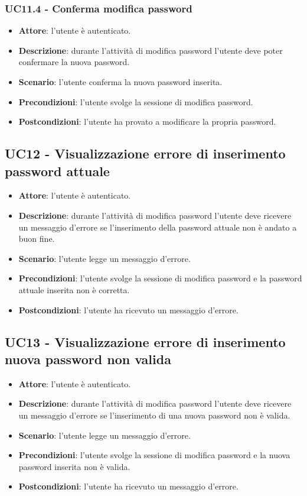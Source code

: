 \subsubsection{UC11.4 - Conferma modifica password}
\begin{itemize}
    \item \textbf{Attore}: l'utente è autenticato.
    \item \textbf{Descrizione}: durante l'attività di modifica password l'utente deve poter confermare la nuova password.
    \item \textbf{Scenario}: l'utente conferma la nuova password inserita. 
    \item \textbf{Precondizioni}: l'utente svolge la sessione di modifica password.
    \item \textbf{Postcondizioni}: l'utente ha provato a modificare la propria password.
\end{itemize}

\subsection{UC12 - Visualizzazione errore di inserimento password attuale}
\begin{itemize}
    \item \textbf{Attore}: l'utente è autenticato.
    \item \textbf{Descrizione}: durante l'attività di modifica password l'utente deve ricevere un messaggio d'errore se l'inserimento della password attuale non è andato a buon fine.
    \item \textbf{Scenario}: l'utente legge un messaggio d'errore. 
    \item \textbf{Precondizioni}: l'utente svolge la sessione di modifica password e la password attuale inserita non è corretta.
    \item \textbf{Postcondizioni}: l'utente ha ricevuto un messaggio d'errore.
\end{itemize}

\subsection{UC13 - Visualizzazione errore di inserimento nuova password non valida}
\begin{itemize}
    \item \textbf{Attore}: l'utente è autenticato.
    \item \textbf{Descrizione}: durante l'attività di modifica password l'utente deve ricevere un messaggio d'errore se l'inserimento di una nuova password non è valida.
    \item \textbf{Scenario}: l'utente legge un messaggio d'errore. 
    \item \textbf{Precondizioni}: l'utente svolge la sessione di modifica password e la nuova password inserita non è valida.
    \item \textbf{Postcondizioni}: l'utente ha ricevuto un messaggio d'errore.

\end{itemize}

